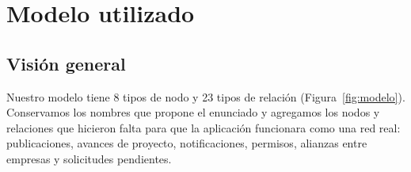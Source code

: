 \documentclass[11pt, a4paper]{article}
\begin{document}
\section{Modelo utilizado}\label{sec:modelo}

\subsection{Visión general}

Nuestro modelo tiene 8 tipos de nodo y 23 tipos de relación (Figura~\ref{fig:modelo}).
Conservamos los nombres que propone el enunciado y agregamos los nodos y relaciones que
hicieron falta para que la aplicación funcionara como una red real: publicaciones,
avances de proyecto, notificaciones, permisos, alianzas entre empresas y solicitudes
pendientes.
\end{document}
